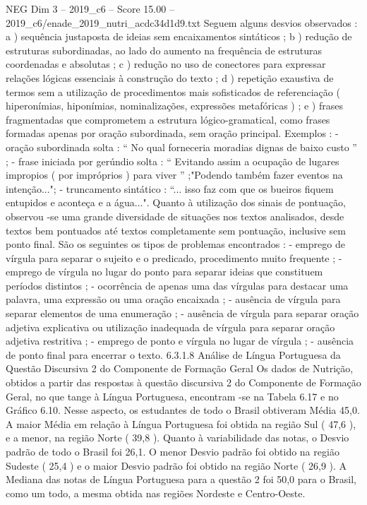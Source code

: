 \begin{textsample}{NEG Dim 3 – 2019\_c6 – Score 15.00 – 2019\_c6/enade\_2019\_nutri\_acdc34d1d9.txt}
Seguem alguns desvios observados : a ) sequência justaposta de ideias sem encaixamentos sintáticos ; b ) redução de estruturas subordinadas, ao lado do aumento na frequência de estruturas coordenadas e absolutas ; c ) redução no uso de conectores para expressar relações lógicas essenciais à construção do texto ; d ) repetição exaustiva de termos sem a utilização de procedimentos mais sofisticados de referenciação ( hiperonímias, hiponímias, nominalizações, expressões metafóricas ) ; e ) frases fragmentadas que comprometem a estrutura lógico-gramatical, como frases formadas apenas por oração subordinada, sem oração principal.
Exemplos : - oração subordinada solta : “ No qual forneceria moradias dignas de baixo custo ” ; - frase iniciada por gerúndio solta : “ Evitando assim a ocupação de lugares impropios ( por impróprios ) para viver ” ;"Podendo também fazer eventos na intenção..."; - truncamento sintático : “... isso faz com que os bueiros fiquem entupidos e aconteça e a água...".
Quanto à utilização dos sinais de pontuação, observou -se uma grande diversidade de situações nos textos analisados, desde textos bem pontuados até textos completamente sem pontuação, inclusive sem ponto final.
São os seguintes os tipos de problemas encontrados : - emprego de vírgula para separar o sujeito e o predicado, procedimento muito frequente ; - emprego de vírgula no lugar do ponto para separar ideias que constituem períodos distintos ; - ocorrência de apenas uma das vírgulas para destacar uma palavra, uma expressão ou uma oração encaixada ; - ausência de vírgula para separar elementos de uma enumeração ; - ausência de vírgula para separar oração adjetiva explicativa ou utilização inadequada de vírgula para separar oração adjetiva restritiva ; - emprego de ponto e vírgula no lugar de vírgula ; - ausência de ponto final para encerrar o texto. 6.3.1.8 Análise de Língua Portuguesa da Questão Discursiva 2 do Componente de Formação Geral Os dados de Nutrição, obtidos a partir das respostas à questão discursiva 2 do Componente de Formação Geral, no que tange à Língua Portuguesa, encontram -se na Tabela 6.17 e no Gráfico 6.10.
Nesse aspecto, os estudantes de todo o Brasil obtiveram Média 45,0.
A maior Média em relação à Língua Portuguesa foi obtida na região Sul ( 47,6 ), e a menor, na região Norte ( 39,8 ).
Quanto à variabilidade das notas, o Desvio padrão de todo o Brasil foi 26,1.
O menor Desvio padrão foi obtido na região Sudeste ( 25,4 ) e o maior Desvio padrão foi obtido na região Norte ( 26,9 ).
A Mediana das notas de Língua Portuguesa para a questão 2 foi 50,0 para o Brasil, como um todo, a mesma obtida nas regiões Nordeste e Centro-Oeste.

\end{textsample}
